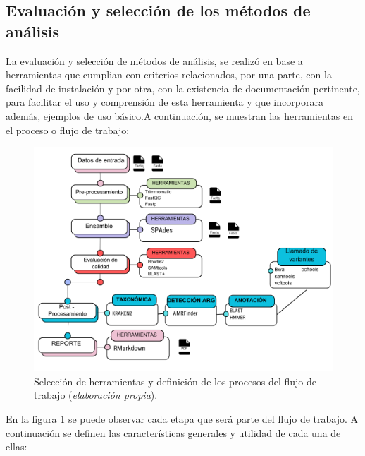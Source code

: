 \documentclass[12pt]{article}
\begin{document}
\subsection{Evaluación y selección de los métodos de análisis}

La evaluación y  selección  de métodos de análisis, se realizó en 
base a herramientas que cumplian con criterios relacionados, 
por una parte, con la facilidad de instalación y por otra, con 
la existencia de  documentación pertinente, para facilitar el uso 
y comprensión  de esta herramienta y que incorporara además, 
ejemplos de uso básico.A continuación, se muestran las herramientas 
en el proceso o flujo de trabajo:

\newpage

\begin{figure}[ht!]
    \centering
    \small
    \includegraphics[scale=0.35]{seleccionMetodosAnalisis.png}
    \caption{Selección de herramientas y definición de los procesos del flujo de trabajo (\emph{elaboración propia}).} 
    \label{fig:seleccionMetodosAnalisis}
\end{figure}

En la figura \ref{fig:seleccionMetodosAnalisis} se puede 
observar cada etapa que será parte del flujo de trabajo. 
A continuación se definen las características generales  y 
utilidad  de cada una de ellas:
\end{document}
